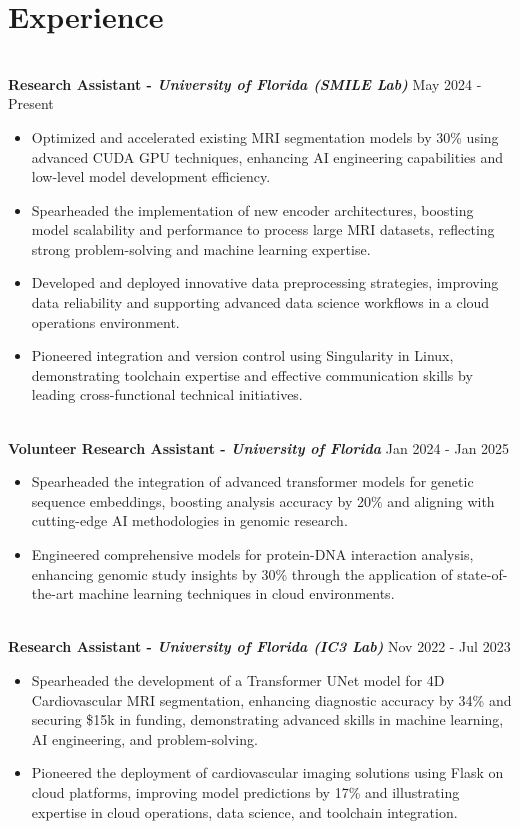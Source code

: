 \documentclass[a4paper,10pt]{article}
\begin{document}
\vspace{-10pt}
\section*{Experience}
\vspace{-3pt}
\textbf{\\ Research Assistant - \textit{University of Florida (SMILE Lab)}}  
\hfill May 2024 - Present
\begin{itemize}
\item Optimized and accelerated existing MRI segmentation models by 30\% using advanced CUDA GPU techniques, enhancing AI engineering capabilities and low-level model development efficiency.
\item Spearheaded the implementation of new encoder architectures, boosting model scalability and performance to process large MRI datasets, reflecting strong problem-solving and machine learning expertise.
\item Developed and deployed innovative data preprocessing strategies, improving data reliability and supporting advanced data science workflows in a cloud operations environment.
\item Pioneered integration and version control using Singularity in Linux, demonstrating toolchain expertise and effective communication skills by leading cross-functional technical initiatives.
\end{itemize}
\vspace{-8pt}
\textbf{\\ Volunteer Research Assistant - \textit{University of Florida}}  
\hfill Jan 2024 - Jan 2025
\begin{itemize}
\item Spearheaded the integration of advanced transformer models for genetic sequence embeddings, boosting analysis accuracy by 20\% and aligning with cutting-edge AI methodologies in genomic research.
\item Engineered comprehensive models for protein-DNA interaction analysis, enhancing genomic study insights by 30\% through the application of state-of-the-art machine learning techniques in cloud environments.
\end{itemize}
\vspace{-8pt}
\textbf{\\ Research Assistant - \textit{University of Florida (IC3 Lab)}}  
\hfill Nov 2022 - Jul 2023
\begin{itemize}
\item Spearheaded the development of a Transformer UNet model for 4D Cardiovascular MRI segmentation, enhancing diagnostic accuracy by 34\% and securing \$15k in funding, demonstrating advanced skills in machine learning, AI engineering, and problem-solving.
\item Pioneered the deployment of cardiovascular imaging solutions using Flask on cloud platforms, improving model predictions by 17\% and illustrating expertise in cloud operations, data science, and toolchain integration.
\end{itemize}
\end{document}
